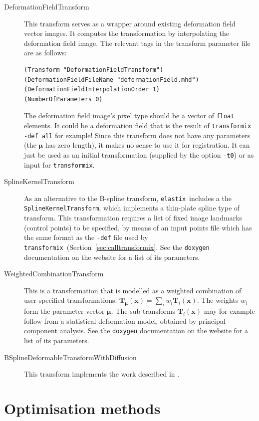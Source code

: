 \documentclass[]{report}
\newcommand{\elastix}{\texttt{elastix}}
\newcommand{\transformix}{\texttt{transformix}}
\newcommand{\vx}{\bm{x}}
\newcommand{\vmu}{\bm{\mu}}
\newcommand{\vT}{\bm{T}}
\newcommand{\vTm}{\bm{T}_{\vmu}}
\begin{document}
\begin{description}
\item[DeformationFieldTransform] This transform serves as a wrapper around
    existing deformation field vector images. It computes the
    transformation by interpolating the deformation field image. The
    relevant tags in the transform parameter file are as follows:
\begin{verbatim}
(Transform "DeformationFieldTransform")
(DeformationFieldFileName "deformationField.mhd")
(DeformationFieldInterpolationOrder 1)
(NumberOfParameters 0)
\end{verbatim}
The deformation field image's pixel type should be a vector of
\texttt{float} elements. It could be a deformation field that is the
result of \texttt{transformix -def all} for example! Since this
transform does not have any parameters (the $\vmu$ has zero length),
it makes no sense to use it for registration. It can just be used as
an initial transformation (supplied by the option \texttt{-t0}) or
as input for \transformix.

\item[SplineKernelTransform] As an alternative to the B-spline transform,
    \elastix\ includes a the \texttt{SplineKernelTransform}, which
    implements a thin-plate spline type of transform. This transformation
    requires a list of fixed image landmarks (control points) to be
    specified, by means of an input points file which has the same format
    as the \texttt{-def} file used by \transformix\
    (Section~\ref{sec:calltransformix}. See the \texttt{doxygen}
    documentation on the website for a list of its parameters.

\item[WeightedCombinationTransform] This is a transformation that is
    modelled as a weighted combination of user-specified transformations:
    $\vTm(\vx) = \sum_i w_i \vT_i(\vx)$. The weights $w_i$ form the
    parameter vector $\vmu$. The sub-transforms $\vT_i(\vx)$ may for
    example follow from a statistical deformation model, obtained by
    principal component analysis. See the \texttt{doxygen} documentation on
    the website for a list of its parameters.

\item[BSplineDeformableTransformWithDiffusion] This transform implements
    the work described in \cite{Staring07a}.
\end{description}

\section{Optimisation methods}
\end{document}
